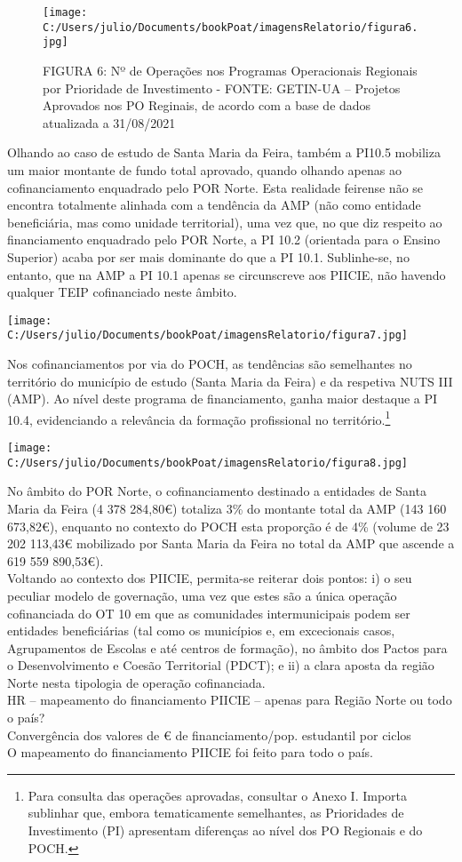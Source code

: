\documentclass[
]{book}
\begin{document}
\begin{figure}
\centering
\texttt{[image: C:/Users/julio/Documents/bookPoat/imagensRelatorio/figura6.jpg]}
\caption{FIGURA 6: Nº de Operações nos Programas Operacionais Regionais por Prioridade de Investimento - FONTE: GETIN-UA -- Projetos Aprovados nos PO Reginais, de acordo com a base de dados atualizada a 31/08/2021}
\end{figure}

Olhando ao caso de estudo de Santa Maria da Feira, também a PI10.5 mobiliza um maior montante de fundo total aprovado, quando olhando apenas ao cofinanciamento enquadrado pelo POR Norte. Esta realidade feirense não se encontra totalmente alinhada com a tendência da AMP (não como entidade beneficiária, mas como unidade territorial), uma vez que, no que diz respeito ao financiamento enquadrado pelo POR Norte, a PI 10.2 (orientada para o Ensino Superior) acaba por ser mais dominante do que a PI 10.1. Sublinhe-se, no entanto, que na AMP a PI 10.1 apenas se circunscreve aos PIICIE, não havendo qualquer TEIP cofinanciado neste âmbito.

\texttt{[image: C:/Users/julio/Documents/bookPoat/imagensRelatorio/figura7.jpg]}

Nos cofinanciamentos por via do POCH, as tendências são semelhantes no território do município de estudo (Santa Maria da Feira) e da respetiva NUTS III (AMP). Ao nível deste programa de financiamento, ganha maior destaque a PI 10.4, evidenciando a relevância da formação profissional no território.\footnote{Para consulta das operações aprovadas, consultar o Anexo I.
  Importa sublinhar que, embora tematicamente semelhantes, as Prioridades de Investimento (PI) apresentam diferenças ao nível dos PO Regionais e do POCH.}

\texttt{[image: C:/Users/julio/Documents/bookPoat/imagensRelatorio/figura8.jpg]}

No âmbito do POR Norte, o cofinanciamento destinado a entidades de Santa Maria da Feira (4 378 284,80€) totaliza 3\% do montante total da AMP (143 160 673,82€), enquanto no contexto do POCH esta proporção é de 4\% (volume de 23 202 113,43€ mobilizado por Santa Maria da Feira no total da AMP que ascende a 619 559 890,53€).\\
Voltando ao contexto dos PIICIE, permita-se reiterar dois pontos: i) o seu peculiar modelo de governação, uma vez que estes são a única operação cofinanciada do OT 10 em que as comunidades intermunicipais podem ser entidades beneficiárias (tal como os municípios e, em excecionais casos, Agrupamentos de Escolas e até centros de formação), no âmbito dos Pactos para o Desenvolvimento e Coesão Territorial (PDCT); e ii) a clara aposta da região Norte nesta tipologia de operação cofinanciada.\\
HR -- mapeamento do financiamento PIICIE -- apenas para Região Norte ou todo o país?\\
Convergência dos valores de € de financiamento/pop. estudantil por ciclos\\
O mapeamento do financiamento PIICIE foi feito para todo o país.
\end{document}
